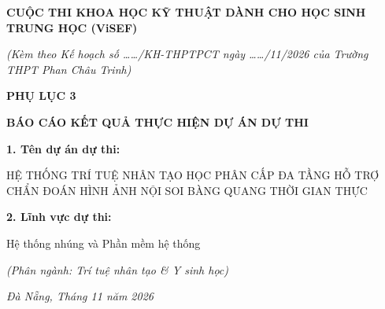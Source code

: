 \documentclass[a4paper]{article}
\begin{document}
\begin{titlepage}
\thispagestyle{empty}
\centering

\vspace*{0.5cm}
{\fontsize{13pt}{15.6pt}\selectfont \textbf{CUỘC THI KHOA HỌC KỸ THUẬT DÀNH CHO HỌC SINH TRUNG HỌC (ViSEF)}\par}
\vspace{0.2cm}
{\fontsize{11.5pt}{13.8pt}\selectfont \textit{(Kèm theo Kế hoạch số ……/KH-THPTPCT ngày ……/11/2026 của Trường THPT Phan Châu Trinh)}\par}

\vspace{2.2cm}

{\fontsize{15pt}{18pt}\selectfont \textbf{PHỤ LỤC 3}\par}
\vspace{0.3cm}
{\fontsize{16pt}{19.2pt}\selectfont \textbf{BÁO CÁO KẾT QUẢ THỰC HIỆN DỰ ÁN DỰ THI}\par}

\vspace{1.8cm}

\begin{center}
\end{center}

\vspace{2.5cm}

\begin{flushleft}
\setlength{\parindent}{1.0cm}
{\fontsize{13pt}{16pt}\selectfont \textbf{1. Tên dự án dự thi:}\par}
{\fontsize{13pt}{16pt}\selectfont HỆ THỐNG TRÍ TUỆ NHÂN TẠO HỌC PHÂN CẤP ĐA TẦNG HỖ TRỢ CHẨN ĐOÁN HÌNH ẢNH NỘI SOI BÀNG QUANG THỜI GIAN THỰC\par}
\vspace{0.5cm}
{\fontsize{13pt}{16pt}\selectfont \textbf{2. Lĩnh vực dự thi:}\par}
{\fontsize{13pt}{16pt}\selectfont Hệ thống nhúng và Phần mềm hệ thống\par}
{\fontsize{12pt}{15pt}\selectfont \textit{(Phân ngành: Trí tuệ nhân tạo \& Y sinh học)}\par}
\end{flushleft}

\vfill
{\fontsize{12pt}{14.4pt}\selectfont \textit{Đà Nẵng, Tháng 11 năm 2026}\par}
\vspace*{0.5cm}

\end{titlepage}
\end{document}
